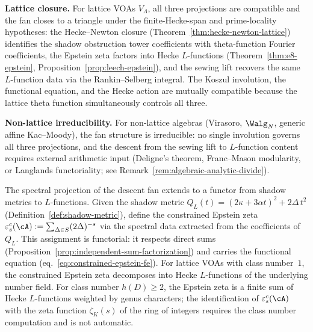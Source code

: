 \medskip\noindent
\textbf{Lattice closure.}\enspace
\ClaimStatusConditional{}
For lattice VOAs $V_\Lambda$, all three projections
are compatible and the fan closes to a triangle under the
finite-Hecke-span and prime-locality hypotheses:
the Hecke--Newton closure
(Theorem~\ref{thm:hecke-newton-lattice}) identifies
the shadow obstruction tower coefficients with theta-function
Fourier coefficients, the Epstein zeta factors into
Hecke $L$-functions
(Theorem~\ref{thm:e8-epstein},
Proposition~\ref{prop:leech-epstein}),
and the sewing lift recovers the same $L$-function
data via the Rankin--Selberg integral. The Koszul
involution, the functional equation, and the Hecke
action are mutually compatible because the lattice
theta function simultaneously controls all three.

\medskip\noindent
\textbf{Non-lattice irreducibility.}\enspace
\ClaimStatusConditional{}
For non-lattice algebras (Virasoro, $\Walg_N$, generic
affine Kac--Moody), the fan structure is irreducible:
no single involution governs all three projections,
and the descent from the sewing lift to $L$-function
content requires external arithmetic input
(Deligne's theorem, Franc--Mason modularity, or
Langlands functoriality; see
Remark~\ref{rem:algebraic-analytic-divide}).

\begin{construction}
\label{constr:shadow-epstein-functor}
The spectral projection of the descent fan extends to
a functor from shadow metrics to $L$-functions. Given
the shadow metric $Q_L(t) = (2\kappa + 3\alpha t)^2
+ 2\Delta\, t^2$
(Definition~\textup{\ref{def:shadow-metric}}),
define the constrained Epstein zeta
$\varepsilon^c_s(\cA) := \sum_{\Delta \in S}
(2\Delta)^{-s}$
via the spectral data extracted from the coefficients
of~$Q_L$. This assignment is functorial: it respects
direct sums
(Proposition~\textup{\ref{prop:independent-sum-factorization}})
and carries the functional equation
\textup{(}eq.~\textup{\eqref{eq:constrained-epstein-fe}}\textup{)}.
For lattice VOAs with class number~$1$, the constrained
Epstein zeta decomposes into Hecke $L$-functions of the
underlying number field. For class number $h(D) \ge 2$,
the Epstein zeta is a finite sum of Hecke $L$-functions
weighted by genus characters; the identification of
$\varepsilon^c_s(\cA)$ with the zeta function
$\zeta_K(s)$ of the ring of integers requires the class
number computation and is not automatic.
\end{construction}

